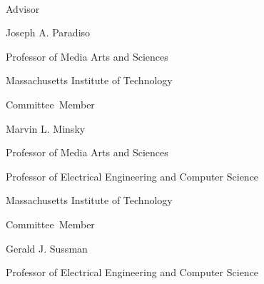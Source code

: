 \thispagestyle{empty}
\begin{center}
    \spacedlowsmallcaps{\myName} \\ \medskip                        

    \begingroup
        \color{Maroon}\spacedallcaps{\myTitle}
    \endgroup
\end{center}        

\vspace{40mm}

\begin{flushright}
  \vspace{10mm}

           Advisor\hspace{0.5cm}~\makebox[2.75in]{\hrulefill}

                                 Joseph A. Paradiso

                                 Professor of Media Arts and Sciences
                                 
                                 Massachusetts Institute of Technology
                                 
  \vspace{10mm}
  
  Committee~Member\hspace{0.5cm}~\makebox[2.75in]{\hrulefill}
  
                                 Marvin L. Minsky

                                 Professor of Media Arts and Sciences

                                 Professor of Electrical Engineering and Computer Science
                                 
                                 Massachusetts Institute of Technology
                                 
  \vspace{10mm}

  Committee~Member\hspace{0.5cm}~\makebox[2.75in]{\hrulefill}
  
                                 Gerald J. Sussman

                                 Professor of Electrical Engineering and Computer Science
                                 

\end{flushright}
